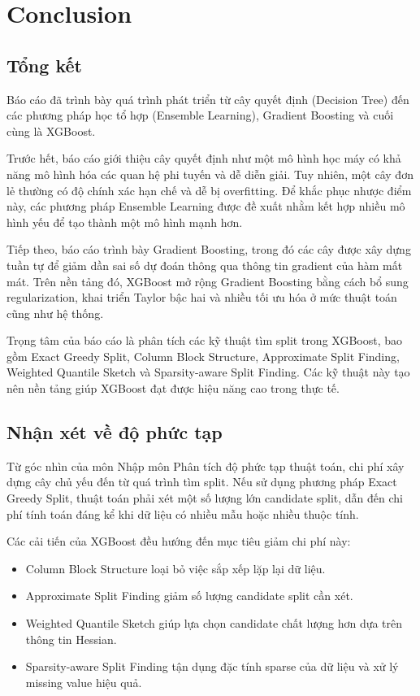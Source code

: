 \section{Conclusion}

\subsection{Tổng kết}

Báo cáo đã trình bày quá trình phát triển từ cây quyết định (Decision Tree) đến các phương pháp học tổ hợp (Ensemble Learning), Gradient Boosting và cuối cùng là XGBoost.

Trước hết, báo cáo giới thiệu cây quyết định như một mô hình học máy có khả năng mô hình hóa các quan hệ phi tuyến và dễ diễn giải. Tuy nhiên, một cây đơn lẻ thường có độ chính xác hạn chế và dễ bị overfitting. Để khắc phục nhược điểm này, các phương pháp Ensemble Learning được đề xuất nhằm kết hợp nhiều mô hình yếu để tạo thành một mô hình mạnh hơn.

Tiếp theo, báo cáo trình bày Gradient Boosting, trong đó các cây được xây dựng tuần tự để giảm dần sai số dự đoán thông qua thông tin gradient của hàm mất mát. Trên nền tảng đó, XGBoost mở rộng Gradient Boosting bằng cách bổ sung regularization, khai triển Taylor bậc hai và nhiều tối ưu hóa ở mức thuật toán cũng như hệ thống.

Trọng tâm của báo cáo là phân tích các kỹ thuật tìm split trong XGBoost, bao gồm Exact Greedy Split, Column Block Structure, Approximate Split Finding, Weighted Quantile Sketch và Sparsity-aware Split Finding. Các kỹ thuật này tạo nên nền tảng giúp XGBoost đạt được hiệu năng cao trong thực tế.

\subsection{Nhận xét về độ phức tạp}

Từ góc nhìn của môn Nhập môn Phân tích độ phức tạp thuật toán, chi phí xây dựng cây chủ yếu đến từ quá trình tìm split. Nếu sử dụng phương pháp Exact Greedy Split, thuật toán phải xét một số lượng lớn candidate split, dẫn đến chi phí tính toán đáng kể khi dữ liệu có nhiều mẫu hoặc nhiều thuộc tính.

Các cải tiến của XGBoost đều hướng đến mục tiêu giảm chi phí này:

\begin{itemize}
    \item Column Block Structure loại bỏ việc sắp xếp lặp lại dữ liệu.
    \item Approximate Split Finding giảm số lượng candidate split cần xét.
    \item Weighted Quantile Sketch giúp lựa chọn candidate chất lượng hơn dựa trên thông tin Hessian.
    \item Sparsity-aware Split Finding tận dụng đặc tính sparse của dữ liệu và xử lý missing value hiệu quả.
\end{itemize}

